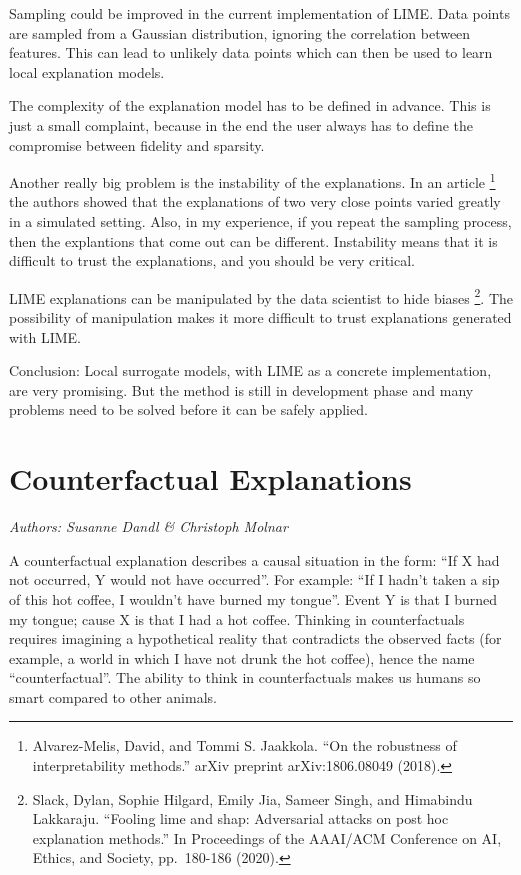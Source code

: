 \documentclass[
  10pt,
]{scrbook}
\begin{document}
Sampling could be improved in the current implementation of LIME.
Data points are sampled from a Gaussian distribution, ignoring the correlation between features.
This can lead to unlikely data points which can then be used to learn local explanation models.

The complexity of the explanation model has to be defined in advance.
This is just a small complaint, because in the end the user always has to define the compromise between fidelity and sparsity.

Another really big problem is the instability of the explanations.
In an article \footnote{Alvarez-Melis, David, and Tommi S. Jaakkola. ``On the robustness of interpretability methods.'' arXiv preprint arXiv:1806.08049 (2018).} the authors showed that the explanations of two very close points varied greatly in a simulated setting.
Also, in my experience, if you repeat the sampling process, then the explantions that come out can be different.
Instability means that it is difficult to trust the explanations, and you should be very critical.

LIME explanations can be manipulated by the data scientist to hide biases \footnote{Slack, Dylan, Sophie Hilgard, Emily Jia, Sameer Singh, and Himabindu Lakkaraju. ``Fooling lime and shap: Adversarial attacks on post hoc explanation methods.'' In Proceedings of the AAAI/ACM Conference on AI, Ethics, and Society, pp.~180-186 (2020).}.
The possibility of manipulation makes it more difficult to trust explanations generated with LIME.

Conclusion:
Local surrogate models, with LIME as a concrete implementation, are very promising.
But the method is still in development phase and many problems need to be solved before it can be safely applied.

\newpage

\hypertarget{counterfactual}{%
\section{Counterfactual Explanations}\label{counterfactual}}

\emph{Authors: Susanne Dandl \& Christoph Molnar}

A counterfactual explanation describes a causal situation in the form: ``If X had not occurred, Y would not have occurred''.
For example: ``If I hadn't taken a sip of this hot coffee, I wouldn't have burned my tongue''.
Event Y is that I burned my tongue;
cause X is that I had a hot coffee.
Thinking in counterfactuals requires imagining a hypothetical reality that contradicts the observed facts (for example, a world in which I have not drunk the hot coffee), hence the name ``counterfactual''.
The ability to think in counterfactuals makes us humans so smart compared to other animals.
\end{document}
